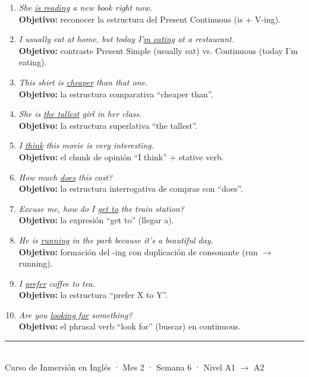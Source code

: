 \documentclass[12pt,a4paper]{article}
\begin{document}
\begin{cajamineria}

\begin{enumerate}[leftmargin=1.2cm]
  \item \textit{She \underline{is reading} a new book right now.}\\
    {\small\textbf{Objetivo:} reconocer la estructura del Present Continuous (is + V-ing).}

  \item \textit{I usually eat at home, but today I'\underline{m eating} at a restaurant.}\\
    {\small\textbf{Objetivo:} contraste Present Simple (usually eat) vs. Continuous (today I'm eating).}

  \item \textit{This shirt is \underline{cheaper} than that one.}\\
    {\small\textbf{Objetivo:} la estructura comparativa ``cheaper than''.}

  \item \textit{She is \underline{the tallest} girl in her class.}\\
    {\small\textbf{Objetivo:} la estructura superlativa ``the tallest''.}

  \item \textit{I \underline{think} this movie is very interesting.}\\
    {\small\textbf{Objetivo:} el chunk de opinión ``I think'' + stative verb.}

  \item \textit{How much \underline{does} this cost?}\\
    {\small\textbf{Objetivo:} la estructura interrogativa de compras con ``does''.}

  \item \textit{Excuse me, how do I \underline{get to} the train station?}\\
    {\small\textbf{Objetivo:} la expresión ``get to'' (llegar a).}

  \item \textit{He is \underline{running} in the park because it's a beautiful day.}\\
    {\small\textbf{Objetivo:} formación del -ing con duplicación de consonante (run $\rightarrow$ running).}

  \item \textit{I \underline{prefer} coffee to tea.}\\
    {\small\textbf{Objetivo:} la estructura ``prefer X to Y''.}

  \item \textit{Are you \underline{looking for} something?}\\
    {\small\textbf{Objetivo:} el phrasal verb ``look for'' (buscar) en continuous.}
\end{enumerate}
\end{cajamineria}

\vfill
\begin{center}
\rule{0.5\textwidth}{0.5pt}\\[0.3cm]
{\small\color{grissuave} Curso de Inmersión en Inglés · Mes 2 · Semana 6 · Nivel A1 $\rightarrow$ A2}
\end{center}
\end{document}
